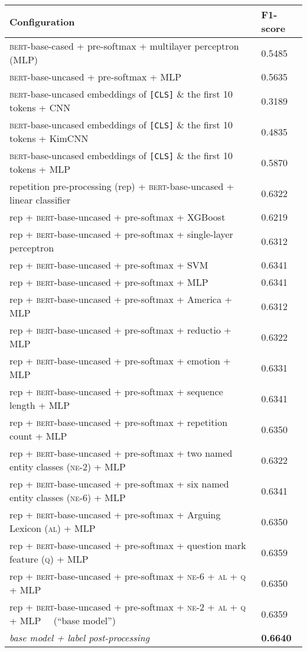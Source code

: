 \renewcommand\arraystretch{1.1}
\begin{tabular}{@{} l R @{}}
\toprule
\textbf{Configuration}     & \textbf{F1-score}     \\
\midrule
\textsc{bert}-base-cased + pre-softmax + multilayer perceptron (MLP) & 0.5485\\
\textsc{bert}-base-uncased + pre-softmax + MLP & 0.5635
\\ %
\hline
\textsc{bert}-base-uncased embeddings of \texttt{[CLS]} \& the first 10 tokens + CNN & 0.3189\\
\textsc{bert}-base-uncased embeddings of \texttt{[CLS]} \& the first 10 tokens + KimCNN & 0.4835\\
\textsc{bert}-base-uncased embeddings of \texttt{[CLS]} \& the first 10 tokens + MLP & 0.5870\\
\hline
repetition pre-processing (rep) + \textsc{bert}-base-uncased + linear classifier & 0.6322 \\ 
rep + \textsc{bert}-base-uncased + pre-softmax + XGBoost  & 0.6219 \\
rep + \textsc{bert}-base-uncased + pre-softmax + single-layer perceptron & 0.6312  \\
rep + \textsc{bert}-base-uncased + pre-softmax + SVM & 0.6341 \\
rep + \textsc{bert}-base-uncased + pre-softmax + MLP & 0.6341 \\
\hline
rep + \textsc{bert}-base-uncased + pre-softmax + America + MLP & 0.6312 \\
rep + \textsc{bert}-base-uncased + pre-softmax + reductio + MLP & 0.6322 \\
rep + \textsc{bert}-base-uncased + pre-softmax + emotion + MLP & 0.6331 \\
rep + \textsc{bert}-base-uncased + pre-softmax + sequence length + MLP & 0.6341 \\
rep + \textsc{bert}-base-uncased + pre-softmax + repetition count + MLP & 0.6350 \\
\hline
rep + \textsc{bert}-base-uncased + pre-softmax + two named entity classes (\textsc{ne-2}) + MLP  & 0.6322\\ 
rep + \textsc{bert}-base-uncased + pre-softmax + six named entity classes (\textsc{ne-6}) + MLP  & 0.6341\\
rep + \textsc{bert}-base-uncased + pre-softmax + Arguing Lexicon (\textsc{al}) + MLP & 0.6350 \\
rep + \textsc{bert}-base-uncased + pre-softmax + question mark feature (\textsc{q}) + MLP  & 0.6359\\
rep + \textsc{bert}-base-uncased + pre-softmax + \textsc{ne-6} + \textsc{al} + \textsc{q} + MLP & 0.6350 \\
rep + \textsc{bert}-base-uncased + pre-softmax + \textsc{ne-2} + \textsc{al} + \textsc{q} + MLP ~~(``base model'') & 0.6359 \\ 
\hline
\textit{base model + label post-processing} & \textbf{0.6640} \\
\bottomrule
\end{tabular}